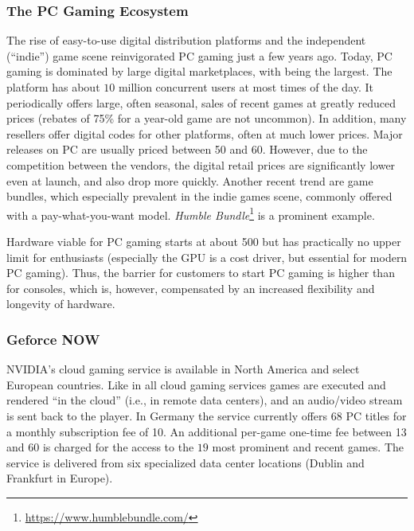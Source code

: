 \subsubsection{The PC Gaming Ecosystem}
\label{sec:pcgaming}

The rise of easy-to-use digital distribution platforms and the independent (``indie'') game scene reinvigorated PC gaming just a few years ago. Today, PC gaming is dominated by large digital marketplaces, with \steam being the largest. The platform has about $10$ million concurrent users at most times of the day. It periodically offers large, often seasonal, sales of recent games at greatly reduced prices (rebates of 75\% for a year-old game are not uncommon). In addition, many resellers offer digital codes for other platforms, often at much lower prices.
Major releases on PC are usually priced between \SI{50}[\EUR]{} and \SI{60}[\EUR]{}. However, due to the competition between the vendors, the digital retail prices are significantly lower even at launch, and also drop more quickly. Another recent trend are game bundles, which especially prevalent in the indie games scene, commonly offered with a pay-what-you-want model. \textit{Humble Bundle}\footnote{\url{https://www.humblebundle.com/}} is a prominent example. 

Hardware viable for PC gaming starts at about \SI{500}[\EUR]{} but has practically no upper limit for enthusiasts (especially the \gls{GPU} is a cost driver, but essential for modern PC gaming). Thus, the barrier for customers to start PC gaming is higher than for consoles, which is, however, compensated by an increased flexibility and longevity of hardware.


\subsubsection{Geforce NOW}

NVIDIA's cloud gaming service%
is available in North America and select European countries. Like in all cloud gaming services  games are executed and rendered ``in the cloud'' (i.e., in remote data centers), and an audio/video stream is sent back to the player. In Germany the service currently offers $68$ PC titles for a monthly subscription fee of \SI{10}[\EUR]{}. An additional per-game one-time fee between \SI{13}[\EUR]{} and \SI{60}[\EUR]{} is charged for the access to the $19$ most prominent and recent games. The service is delivered from six specialized data center locations (Dublin and Frankfurt in Europe).

